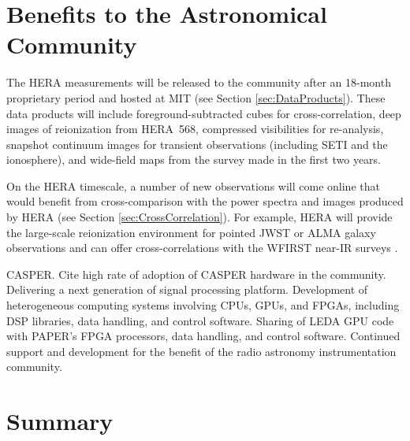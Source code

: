 \documentclass[preprint]{aastex}
\begin{document}

\section{Benefits to the Astronomical Community}


The HERA measurements will be released to the community after an 18-month proprietary period and hosted at MIT (see Section \ref{sec:DataProducts}).  These data products will include foreground-subtracted cubes for
cross-correlation, deep images of reionization from HERA~568, compressed visibilities for re-analysis, snapshot continuum images for transient observations (including SETI and the ionosphere), and wide-field maps from the survey made in the first two years.

On the HERA timescale, a number of new observations will come online that would benefit from cross-comparison with the power spectra and images produced by HERA (see Section \ref{sec:CrossCorrelation}). For example, HERA will provide the large-scale reionization environment for pointed JWST or ALMA galaxy observations and can offer cross-correlations with  the WFIRST near-IR surveys \citep{lidz_et_al2009}.
 
CASPER.
Cite high rate of adoption of CASPER hardware in the community.
Delivering a next generation of signal processing platform.
Development of heterogeneous computing systems involving CPUs, GPUs, and FPGAs, including DSP libraries, data handling, and control software.
Sharing of LEDA GPU code \citep{clark_et_al2011} with PAPER's FPGA processors, data handling, and control software.
Continued support and development for the benefit of the radio astronomy instrumentation community.




\section{Summary} %
\end{document}
